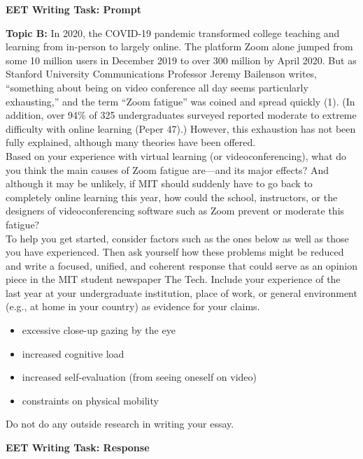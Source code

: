 \documentclass[12pt]{article}
\begin{document}
\begin{center}
	\textbf{EET Writing Task: Prompt}
\end{center}

\begin{framed}
	\noindent \textbf{Topic B:}  In 2020, the COVID-19 pandemic transformed college teaching and learning from in-person to largely online. The platform Zoom alone jumped from some 10 million users in December 2019 to over 300 million by April 2020. But as Stanford University Communications Professor Jeremy Bailenson writes, ``something about being on video conference all day seems particularly exhausting,'' and the term ``Zoom fatigue'' was coined and spread quickly (1). (In addition, over 94\% of 325 undergraduates surveyed reported moderate to extreme difficulty with online learning (Peper 47).) However, this exhaustion has not been fully explained, although many theories have been offered.\\
	
	
	
	\noindent Based on your experience with virtual learning (or videoconferencing), what do you think the main causes of Zoom fatigue are—and its major effects? And although it may be unlikely, if MIT should suddenly have to go back to completely online learning this year, how could the school, instructors, or the designers of videoconferencing software such as Zoom prevent or moderate this fatigue?\\
	
	
	
	\noindent To help you get started, consider factors such as the ones below as well as those you have experienced. Then ask yourself how these problems might be reduced and write a focused, unified, and coherent response that could serve as an opinion piece in the MIT student newspaper The Tech. Include your experience of the last year at your undergraduate institution, place of work, or general environment (e.g., at home in your country) as evidence for your claims.
	
	\begin{itemize}
		\item excessive close-up gazing by the eye
		\item increased cognitive load
		\item increased self-evaluation (from seeing oneself on video)
		\item constraints on physical mobility
	\end{itemize}
	
	\noindent Do not do any outside research in writing your essay.
\end{framed}


\newpage


\begin{center}
	\textbf{EET Writing Task: Response}
\end{center}












	
	
	
	
	
\end{document}
